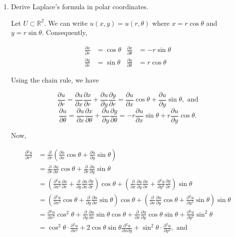 \documentclass[11pt,oneside,english]{amsart}
\theoremstyle{definition}
\newcommand{\R}{\mathbb{R}}
\newcommand{\pp}[2]{\frac{\partial{#1}}{\partial{#2}}}
\begin{document}
\rightline{\today}



\vspace{1cm}
\begin{enumerate}



\vspace{-1cm}

\item Derive Laplace's formula in polar coordinates.

Let $U\subset \R^2$. We can write $u(x,y)=u(r,\theta)$ where $x=r\cos\theta$ and $y=r\sin\theta$. Consequently,

\begin{align*}
\pp{x}{r}&=\cos\theta & \pp{x}{\theta}&=-r\sin\theta\\[2mm]
\pp{y}{r}&=\sin\theta & \pp{y}{\theta}&=r\cos\theta
\end{align*}

Using the chain rule, we have


\[
\pp{u}{r}=\pp{u}{x}\pp{x}{r}+\pp{u}{y}\pp{y}{r}=\pp{u}{x}\cos\theta+\pp{u}{y}\sin\theta,\text{ and}
\]
\[
\pp{u}{\theta}=\pp{u}{x}\pp{x}{\theta}+\pp{u}{y}\pp{y}{\theta}=-r\pp{u}{x}\sin\theta+r\pp{u}{y}\cos\theta.
\]

Now,

\begin{align*}
\pp{^2u}{r^2}&=\pp{}{r}\left(\pp{u}{x}\cos\theta+\pp{u}{y}\sin\theta\right)\\[2mm]
&=\pp{}{r}\pp{u}{x}\cos\theta+\pp{}{r}\pp{u}{y}\sin\theta\\[2mm]
&=\left(\pp{^2u}{x^2}\pp{x}{r}+\pp{}{y}\pp{u}{x}\pp{y}{r}\right)\cos\theta+\left(\pp{}{x}\pp{u}{y}\pp{x}{r}+\pp{^2u}{y^2}\pp{y}{r}\right)\sin\theta\\[2mm]
&=\left(\pp{^2u}{x^2}\cos\theta+\pp{}{y}\pp{u}{x}\sin\theta\right)\cos\theta+\left(\pp{}{x}\pp{u}{y}\cos\theta+\pp{^2u}{y^2}\sin\theta\right)\sin\theta\\[2mm]
&=\pp{^2u}{x^2}\cos^2\theta+\pp{}{y}\pp{u}{x}\sin\theta\cos\theta+\pp{}{x}\pp{u}{y}\cos\theta\sin\theta+\pp{^2u}{y^2}\sin^2\theta\\[2mm]
&=\cos^2\theta\cdot\pp{^2u}{x^2}+2\cos\theta\sin\theta\pp{^2u}{x\partial y}+\sin^2\theta\cdot\pp{^2u}{y^2},\text{ and}
\end{align*}


\end{enumerate}
\end{document}
